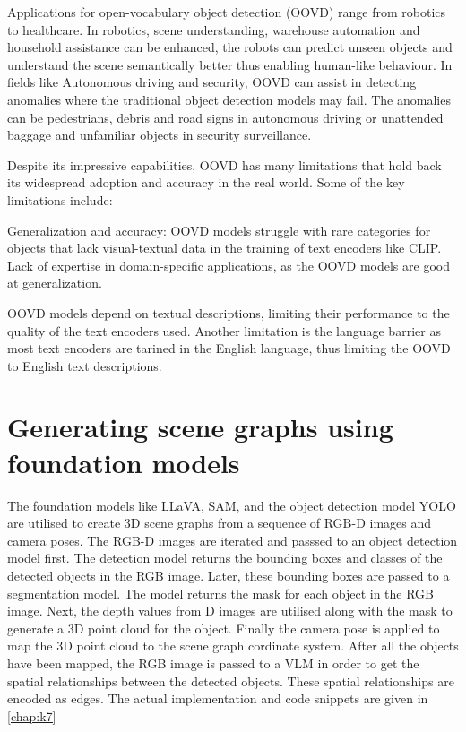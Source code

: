 Applications for open-vocabulary object detection (OOVD) range from robotics to healthcare. In robotics, scene understanding, warehouse automation and household
assistance can be enhanced, the robots can predict unseen objects and understand the scene semantically better thus enabling human-like behaviour. In fields like Autonomous 
driving and security, OOVD can assist in detecting anomalies where the traditional object detection models may fail. The anomalies can be pedestrians, debris and
 road signs in autonomous driving or unattended baggage and unfamiliar objects in security surveillance.

 Despite its impressive capabilities, OOVD has many limitations that hold back its widespread adoption and accuracy in the real world. Some of the key limitations 
 include:
 \begin{compactenum}[1.]
    \item Generalization and accuracy: OOVD models struggle with rare categories for objects that lack visual-textual data in the training of text encoders like
    CLIP. Lack of expertise in domain-specific applications, as the OOVD models are good at generalization. 
    \item OOVD models depend on textual descriptions, limiting their performance to the quality of the text encoders used. Another limitation is the 
     language barrier as most text encoders are tarined in the English language, thus limiting the OOVD to English text descriptions. 
 \end{compactenum}
\section{Generating scene graphs using foundation models}
The foundation models like LLaVA, SAM, and the object detection model YOLO are utilised to create 3D scene graphs from a 
sequence of RGB-D images and camera poses. The RGB-D images are iterated and passsed to an object detection model first. The 
detection model returns the bounding boxes and classes of the detected objects in the RGB image. Later, these bounding boxes 
are passed to a segmentation model. The model returns the mask for each object in the RGB image. Next, the depth values from D images are 
utilised along with the mask to generate a 3D point cloud for the object. Finally the camera pose is applied to map the 
3D point cloud to the scene graph cordinate system. After all the objects have been mapped, the RGB image is passed to a 
VLM in order to get the spatial relationships between the detected objects. These spatial relationships are encoded as 
edges. The actual implementation and code snippets are given in \cref{chap:k7} 
